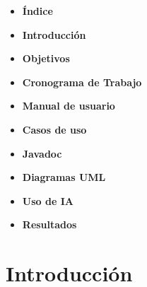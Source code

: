 \documentclass[man]{apa7}
\begin{document}
	\begin{itemize}
		
		\item \textbf{Índice} \dotfill \pageref{sec:Índice}
		
		\item \textbf{Introducción} \dotfill \pageref{sec:Introducción}
		
		\item \textbf{Objetivos} \dotfill \pageref{sec:Objetivos}
		
		\item \textbf{Cronograma de Trabajo} \dotfill \pageref{sec:Cronograma de Trabajo}
		
		\item \textbf{Manual de usuario} \dotfill \pageref{sec:Manual de usuario}
		
		\item \textbf{Casos de uso} \dotfill \pageref{sec:Casos de uso}
		
		\item \textbf{Javadoc} \dotfill \pageref{sec:Javadoc}
		
		\item \textbf{Diagramas UML} \dotfill \pageref{sec:Diagramas UML}
		
		\item \textbf{Uso de IA} \dotfill \pageref{sec:Uso de IA}
		
		\item \textbf{Resultados} \dotfill \pageref{sec:Resultados}
		
	\end{itemize}
	
	\vspace*{\fill}
	
	\newpage
	
	\section*{Introducción} \label{sec:Introducción}
	
	\vspace*{\fill}
	
\end{document}
